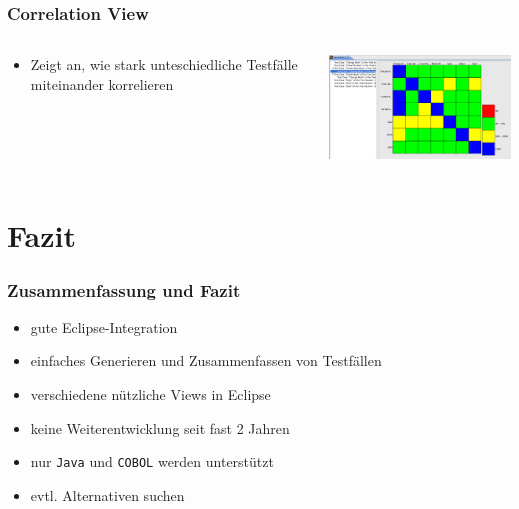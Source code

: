 \documentclass{beamer}
\begin{document}
   \begin{frame}\frametitle{Correlation View}
    \begin{columns}
      \begin{column}{4cm}
        \begin{itemize}
          \item Zeigt an, wie stark unteschiedliche Testfälle miteinander korrelieren
        \end{itemize}
        \vspace{2cm}
      \end{column}
      \begin{column}{6cm}
        \begin{overprint}
          \includegraphics[width=7cm]{pictures/demo_eclipse/04_correlation_view.png}
        \end{overprint}
      \end{column}
    \end{columns}
  \end{frame}


  \section{Fazit}
  \begin{frame}\frametitle{Zusammenfassung und Fazit}
    \begin{itemize}
      \item gute Eclipse-Integration
      \item einfaches Generieren und Zusammenfassen von Testfällen
      \item verschiedene nützliche Views in Eclipse
      \item keine Weiterentwicklung seit fast 2 Jahren
      \item nur \texttt{Java} und \texttt{COBOL} werden unterstützt
      \item evtl. Alternativen suchen
    \end{itemize}
  \end{frame}
\end{document}
